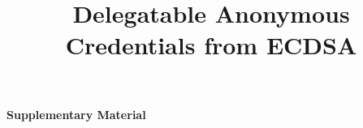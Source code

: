 \documentclass{article}
\title{Delegatable Anonymous Credentials from ECDSA}
\author{}
\date{}
\begin{document}
\maketitle

\begin{abstract}
\end{abstract}









\newpage



\newpage
\begin{center}
    \huge{\textbf{Supplementary Material}}
\end{center}
\end{document}
